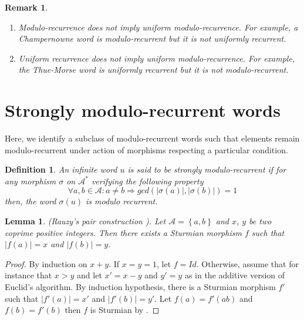 \documentclass[a4 paper,12pt]{article}
\newtheorem{lemma}{Lemma}[section]
\newtheorem{remark}{Remark}[section]
\newtheorem{definition}{Definition}[section]
\begin{document}
\begin{remark}  
\begin{enumerate}
	\item Modulo-recurrence  does  not imply   uniform modulo-recurrence. For example, a Champernowne word is modulo-recurrent but it is not uniformly recurrent.
	\item Uniform  recurrence does not imply uniform modulo-recurrence. For example,  the Thue-Morse word is uniformly recurrent but it is not modulo-recurrent.
	\end{enumerate}
\end{remark}

\section{Strongly modulo-recurrent words}

Here, we identify a subclass of modulo-recurrent  words such that elements remain  modulo-recurrent under action of morphisms respecting  a particular condition. %


\begin{definition}
An infinite  word $u$ is said to be strongly modulo-recurrent  if for any morphism  $\sigma$ on $\mathcal{A}^{*}$ verifying the following property
$$\forall a, b\in \mathcal{A}: a\neq b \Rightarrow  gcd(\left|\sigma(a)\right|,\left|\sigma(b)\right|)=1$$
then,   the word $\sigma(u)$ is modulo recurrent.
\end{definition}

\begin{lemma} \label{Rauzy-pairs} (Rauzy's pair construction \cite{17}). Let $\mathcal{A}=\left\lbrace a,b \right\rbrace$ and $x$, $y$ be two coprime positive integers. Then there exists a Sturmian morphism $f$ such that $|f(a)|=x$ and $|f(b)|=y$.

\end{lemma}


\begin{proof}
By induction on $x+y$. If $x=y=1$, let $f=Id$. Otherwise, assume that for instance that $x>y$ and let $x'=x-y$ and $y'=y$ as in the additive version of Euclid's algorithm. By induction hypothesis, there is a Sturmian morphism $f'$ such that 
$|f'(a)|=x'$ and $|f'(b)|=y'$. Let $f(a)=f'(ab)$ and $f(b)=f'(b)$ then $f$ is Sturmian by \cite{17}.
\end{proof}
\end{document}
